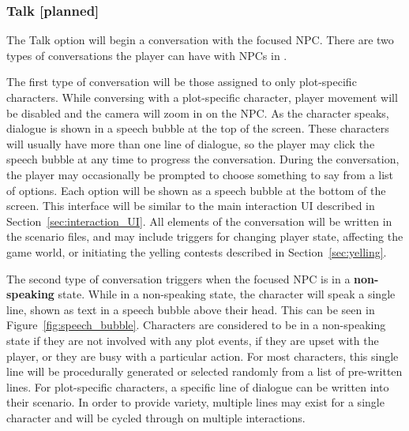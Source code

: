 \documentclass{GlobalDocument}
\begin{document}
\subsubsection{Talk [planned]}
The Talk option will begin a conversation with the focused NPC. There are two types of conversations the player can have with NPCs in \ourgame{}.

The first type of conversation will be those assigned to only plot-specific characters. While conversing with a plot-specific character, player movement will be disabled and the camera will zoom in on the NPC. As the character speaks, dialogue is shown in a speech bubble at the top of the screen. These characters will usually have more than one line of dialogue, so the player may click the speech bubble at any time to progress the conversation. During the conversation, the player may occasionally be prompted to choose something to say from a list of options. Each option will be shown as a speech bubble at the bottom of the screen. This interface will be similar to the main interaction UI described in Section~\ref{sec:interaction_UI}. All elements of the conversation will be written in the scenario files, and may include triggers for changing player state, affecting the game world, or initiating the yelling contests described in Section~\ref{sec:yelling}.

The second type of conversation triggers when the focused NPC is in a \textbf{non-speaking} state. While in a non-speaking state, the character will speak a single line, shown as text in a speech bubble above their head. This can be seen in Figure~\ref{fig:speech_bubble}. Characters are considered to be in a non-speaking state if they are not involved with any plot events, if they are upset with the player, or they are busy with a particular action. For most characters, this single line will be procedurally generated or selected randomly from a list of pre-written lines. For plot-specific characters, a specific line of dialogue can be written into their scenario. In order to provide variety, multiple lines may exist for a single character and will be cycled through on multiple interactions.
\end{document}
